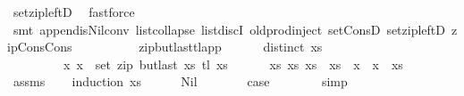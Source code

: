 \begin{isabellebody}
\ set{\isacharunderscore}{\kern0pt}zip{\isacharunderscore}{\kern0pt}leftD\ \isamarkupfalse%
\ fastforce\isanewline
\ \ \ \ \isamarkupfalse%
\ {\isacharparenleft}{\kern0pt}smt\ append{\isacharunderscore}{\kern0pt}is{\isacharunderscore}{\kern0pt}Nil{\isacharunderscore}{\kern0pt}conv\ list{\isachardot}{\kern0pt}collapse\ list{\isachardot}{\kern0pt}discI\ old{\isachardot}{\kern0pt}prod{\isachardot}{\kern0pt}inject\ set{\isacharunderscore}{\kern0pt}ConsD\ set{\isacharunderscore}{\kern0pt}zip{\isacharunderscore}{\kern0pt}leftD\ zip{\isacharunderscore}{\kern0pt}Cons{\isacharunderscore}{\kern0pt}Cons{\isacharparenright}{\kern0pt}\isanewline
\ \ \ \ \isamarkupfalse%
%
\endisatagproof
{\isafoldproof}%
%
\isadelimproof
%
\endisadelimproof
\ \isanewline
\isanewline
\ \ \isamarkupfalse%
\ zip{\isacharunderscore}{\kern0pt}butlast{\isacharunderscore}{\kern0pt}tl{\isacharunderscore}{\kern0pt}app{}{\isacharcolon}{\kern0pt}\ \isanewline
\ \ \ \ \ {\isachardoublequoteopen}distinct\ xs{\isachardoublequoteclose}\ \isanewline
\ \ \ \ \ \ \ \ \ {\isachardoublequoteopen}{\isacharparenleft}{\kern0pt}x\ x\ {\isasymin}\ set\ {\isacharparenleft}{\kern0pt}zip\ {\isacharparenleft}{\kern0pt}butlast\ xs{\isacharparenright}{\kern0pt}\ {\isacharparenleft}{\kern0pt}tl\ xs{\isacharparenright}{\kern0pt}{\isacharparenright}{\kern0pt}{\isachardoublequoteclose}\ \isanewline
\ \ \ \ \ {\isachardoublequoteopen}{\isasymexists}xs\ xs\ xs\ {\isacharequal}{\kern0pt}\ xs\ {\isacharat}{\kern0pt}\ x\ {\isacharhash}{\kern0pt}\ x\ {\isacharhash}{\kern0pt}\ xs\isanewline
%
\isadelimproof
\ \ \ \ %
\endisadelimproof
%
\isatagproof
{}\isamarkupfalse%
\ assms\isanewline
\ \ \isamarkupfalse%
\ {\isacharparenleft}{\kern0pt}induction\ xs{\isacharparenright}{\kern0pt}\isanewline
\ \ \ \ \isamarkupfalse%
\ Nil\isanewline
\ \ \ \ \isamarkupfalse%
\ \isamarkupfalse%
\ {\isacharquery}{\kern0pt}case\isanewline
\ \ \ \ \ \ \isamarkupfalse%
\ simp\isanewline
\ \ \isamarkupfalse%
\isanewline
\ \ \ \ \isamarkupfalse%

\end{isabellebody}

